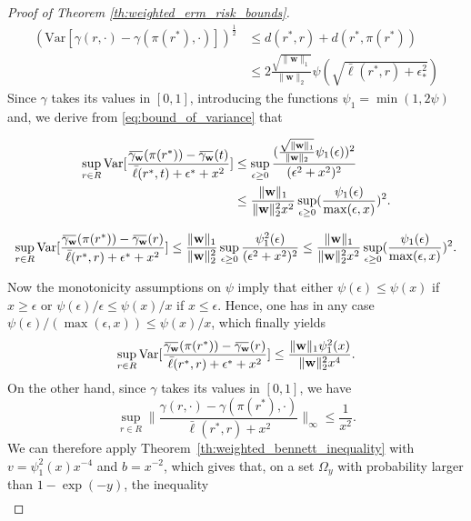 \documentclass[letterpaper]{article} %
\def\DoubleColumn{}
\def\DoubleColumnEnd{}
\def\SingleColumn{}
\def\SingleColumnEnd{}
\newcommand{\Var}{\text{Var}}
\newcommand{\overbar}[1]{\mkern 1.5mu\overline{\mkern-1.5mu#1\mkern-1.5mu}\mkern 1.5mu}
\newcommand*\cen[1]{\overbar{#1}}
\newcommand{\weight}{\mathbf{w}}
\newcommand{\relossf}{\bar{\ell}}
\newcommand{\cenprocess}[1]{\cen{\gamma_{#1}}}
\newcommand{\normo}[1]{\|#1\|_1}
\begin{document}
\begin{proof}[Proof of Theorem \ref{th:weighted_erm_risk_bounds}]
    \begin{equation}
        \begin{aligned}
            \label{eq:bound_of_variance}
            (\Var[\gamma(r,\cdot)-\gamma(\pi(r^*),\cdot)])^{\frac{1}{2}}&\le d(r^*,r)+d(r^*, \pi(r^*))\\
            &\le 2\frac{\sqrt{\normo{\weight{}}}}{\|\weight{}\|_2}\psi(\sqrt{\relossf(r^*,r)+\epsilon_*^2})
        \end{aligned}
    \end{equation}
    Since $\gamma$ takes its values in $[0,1]$, introducing the functions $\psi_1=\min(1,2\psi)$ and, we derive from \eqref{eq:bound_of_variance} that
    \DoubleColumn
    \begin{align*}
        \sup_{r\in R}\Var[\frac{\cenprocess{\weight}(\pi(r^*))-\cenprocess{\weight}(t)}{\relossf(r^*,t)+\epsilon^*+x^2}]&\le \sup_{\epsilon\ge 0}\frac{(\frac{\sqrt{\normo{\weight{}}}}{\|\weight{}\|_2}\psi_1(\epsilon))^2}{(\epsilon^2+x^2)^2}\\
        &\le \frac{\normo{\weight{}}}{\|\weight{}\|_2^2x^2}\sup_{\epsilon\ge 0}(\frac{\psi_1(\epsilon)}{\max(\epsilon,x)})^2.
    \end{align*}
    \DoubleColumnEnd
    \SingleColumn
    \[\sup_{r\in R}\Var[\frac{\cenprocess{\weight}(\pi(r^*))-\cenprocess{\weight}(r)}{\relossf(r^*,r)+\epsilon^*+x^2}]\le \frac{\normo{\weight{}}}{\|\weight{}\|_2^2}\sup_{\epsilon\ge 0}\frac{\psi_1^2(\epsilon)}{(\epsilon^2+x^2)^2}\le \frac{\normo{\weight{}}}{\|\weight{}\|_2^2x^2}\sup_{\epsilon\ge 0}(\frac{\psi_1(\epsilon)}{\max(\epsilon,x)})^2.\]
    \SingleColumnEnd
    Now the monotonicity assumptions on $\psi$ imply that either $\psi(\epsilon)\le \psi(x)$ if $x\ge \epsilon$ or $\psi(\epsilon)/\epsilon\le \psi(x)/x$ if $x\le \epsilon$. Hence, one has in any case $\psi(\epsilon)/(\max(\epsilon,x))\le \psi(x)/x$, which finally yields
    \[\sup_{r\in R}\Var[\frac{\cenprocess{\weight}(\pi(r^*))-\cenprocess{\weight}(r)}{\relossf(r^*,r)+\epsilon^*+x^2}]\le\frac{\normo{\weight{}}\psi_1^2(x)}{\|\weight{}\|_2^2x^4}.\]
    On the other hand, since $\gamma$ takes its values in $[0,1]$, we have
    \[\sup_{r\in R}\|\frac{\gamma(r,\cdot)-\gamma(\pi(r^*),\cdot)}{\relossf(r^*,r)+x^2}\|_\infty\le \frac{1}{x^2}.\]
    We can therefore apply Theorem~\ref{th:weighted_bennett_inequality} with $v=\psi_1^2(x)x^{-4}$ and $b=x^{-2}$, which gives that, on a set $\Omega_y$ with probability larger than $1-\exp(-y)$, the inequality
    \begin{equation}
        \begin{aligned}

\end{aligned}
\end{equation}
\end{proof}
\end{document}
